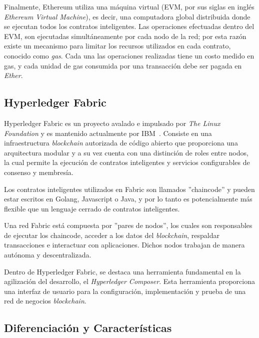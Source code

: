 Finalmente, Ethereum utiliza una máquina virtual (EVM, por sus siglas en inglés {\it Ethereum Virtual Machine}), es decir, una computadora global distribuida donde se ejecutan todos los contratos inteligentes. Las operaciones efectuadas dentro del EVM, son ejecutadas simultáneamente por cada nodo de la red; por esta razón existe un mecanismo para limitar los recursos utilizados en cada contrato, conocido como \textit{gas}. Cada una las operaciones realizadas tiene un costo medido en gas, y cada unidad de gas consumida por una transacción debe ser pagada en \textit{Ether}.

\subsection{Hyperledger Fabric} 
Hyperledger Fabric es un proyecto avalado e impulsado por \textit{The Linux Foundation} y es mantenido actualmente por IBM~\cite{androulaki2018hyperledger}. Consiste en una infraestructura \textit{blockchain} autorizada de código abierto que proporciona una arquitectura modular y a su vez cuenta con una distinción de roles entre nodos, la cual permite la  ejecución de contratos inteligentes y servicios configurables de consenso y membresía. 

Los contratos inteligentes utilizados en Fabric son llamados ''chaincode'' y pueden estar escritos en Golang, Javascript o Java, y por lo tanto es potencialmente más flexible que un lenguaje cerrado de contratos inteligentes.

Una red Fabric está compuesta por ''pares de nodos'', los cuales son responsables de ejecutar los chaincode, acceder a los datos del \textit{blockchain}, respaldar transacciones e interactuar con aplicaciones. Dichos nodos trabajan de manera autónoma y descentralizada.

Dentro de Hyperledger Fabric, se destaca una herramienta fundamental en la agilización del desarrollo, el \textit{Hyperledger Composer}. Esta herramienta proporciona una interfaz de usuario para la configuración, implementación y prueba de una red de negocios \textit{blockchain}.

\subsection{Diferenciación y Características}

